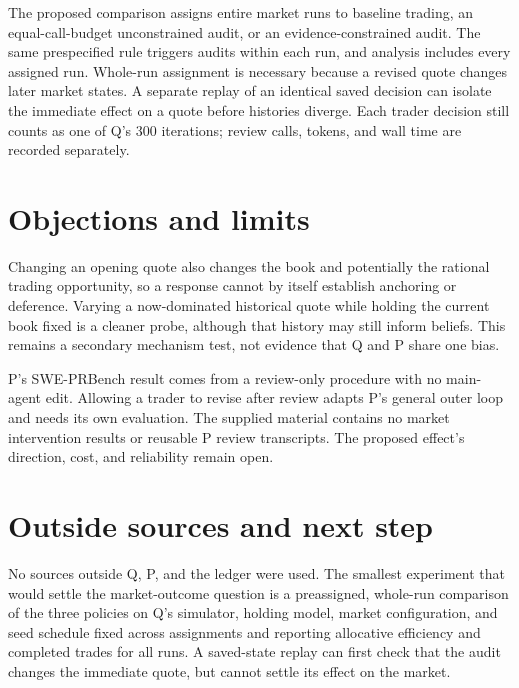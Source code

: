 \documentclass{article}
\begin{document}
The proposed comparison assigns entire market runs to baseline trading, an equal-call-budget unconstrained audit, or an evidence-constrained audit. The same prespecified rule triggers audits within each run, and analysis includes every assigned run. Whole-run assignment is necessary because a revised quote changes later market states. A separate replay of an identical saved decision can isolate the immediate effect on a quote before histories diverge. Each trader decision still counts as one of Q's \(300\) iterations; review calls, tokens, and wall time are recorded separately. 

\section*{Objections and limits}

Changing an opening quote also changes the book and potentially the rational trading opportunity, so a response cannot by itself establish anchoring or deference. Varying a now-dominated historical quote while holding the current book fixed is a cleaner probe, although that history may still inform beliefs. This remains a secondary mechanism test, not evidence that Q and P share one bias. 

P's SWE-PRBench result comes from a review-only procedure with no main-agent edit. Allowing a trader to revise after review adapts P's general outer loop and needs its own evaluation. The supplied material contains no market intervention results or reusable P review transcripts. The proposed effect's direction, cost, and reliability remain open. 

\section*{Outside sources and next step}

No sources outside Q, P, and the ledger were used. The smallest experiment that would settle the market-outcome question is a preassigned, whole-run comparison of the three policies on Q's simulator, holding model, market configuration, and seed schedule fixed across assignments and reporting allocative efficiency and completed trades for all runs. A saved-state replay can first check that the audit changes the immediate quote, but cannot settle its effect on the market. 
\end{document}

